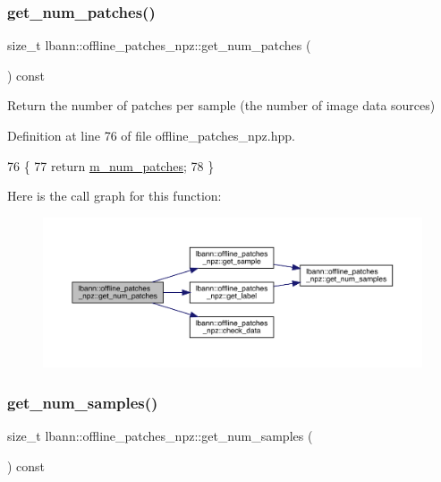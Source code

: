 \subsubsection{\texorpdfstring{get\+\_\+num\+\_\+patches()}{get\_num\_patches()}}
{\footnotesize\ttfamily size\+\_\+t lbann\+::offline\+\_\+patches\+\_\+npz\+::get\+\_\+num\+\_\+patches (\begin{DoxyParamCaption}{ }\end{DoxyParamCaption}) const\hspace{0.3cm}{\ttfamily [inline]}}



Return the number of patches per sample (the number of image data sources) 



Definition at line 76 of file offline\+\_\+patches\+\_\+npz.\+hpp.


\begin{DoxyCode}
76                                  \{
77     \textcolor{keywordflow}{return} \hyperlink{classlbann_1_1offline__patches__npz_a5c13583d344641295301f82a32ebee41}{m\_num\_patches};
78   \}
\end{DoxyCode}
Here is the call graph for this function\+:\nopagebreak
\begin{figure}[H]
\begin{center}
\leavevmode
\includegraphics[width=350pt]{classlbann_1_1offline__patches__npz_a153f67de70844a6820aa472f91a6245e_cgraph}
\end{center}
\end{figure}
\mbox{\label{classlbann_1_1offline__patches__npz_aa6fa05575f54a29b67d0bba8a2a9d363}} 
\subsubsection{\texorpdfstring{get\+\_\+num\+\_\+samples()}{get\_num\_samples()}}
{\footnotesize\ttfamily size\+\_\+t lbann\+::offline\+\_\+patches\+\_\+npz\+::get\+\_\+num\+\_\+samples (\begin{DoxyParamCaption}{ }\end{DoxyParamCaption}) const\hspace{0.3cm}{\ttfamily [inline]}}



